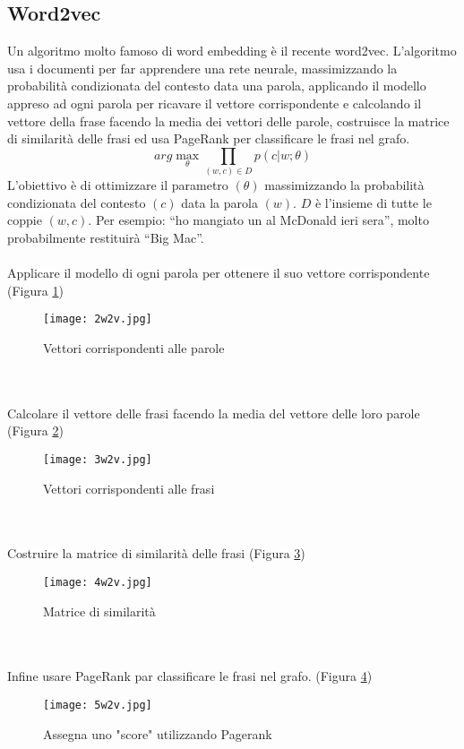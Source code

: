 \subsection{Word2vec}
Un algoritmo molto famoso di word embedding è il recente word2vec. L’algoritmo usa i documenti per far apprendere una rete neurale, massimizzando la probabilità condizionata del contesto data una parola, applicando il modello appreso ad ogni parola per ricavare il vettore corrispondente e calcolando il vettore della frase facendo la media dei vettori delle parole, costruisce la matrice di similarità delle frasi ed usa PageRank per classificare le frasi nel grafo.
\begin{equation}
   arg\max_{\theta} \prod_{\left ( w, c \right ) \in D} p\left ( c|w; \theta \right )
\end{equation}
L’obiettivo è di ottimizzare il parametro $ \left (\theta \right )$ massimizzando la probabilità condizionata del contesto $\left ( c \right )$ data la parola $\left ( w \right )$. $D$ è l’insieme di tutte le coppie $\left ( w, c \right )$. 
Per esempio: “ho mangiato un \underline{\hspace{1cm}}  al McDonald ieri sera”, molto probabilmente restituirà “Big Mac”.
\\\\
Applicare il modello di ogni parola per ottenere il suo vettore corrispondente (Figura \ref{2w2v})
\begin{figure}[htb]
	\centering
	\texttt{[image: 2w2v.jpg]}
	\caption{Vettori corrispondenti alle parole}
	\label{2w2v}
\end{figure}
\\\\
Calcolare il vettore delle frasi facendo la media del vettore delle loro parole (Figura \ref{3w2v})
\begin{figure}[htb]
	\centering
	\texttt{[image: 3w2v.jpg]}
	\caption{Vettori corrispondenti alle frasi}
	\label{3w2v}
\end{figure}
\\\\
Costruire la matrice di similarità delle frasi (Figura \ref{4w2v})
\begin{figure}[htb]
	\centering
	\texttt{[image: 4w2v.jpg]}
	\caption{Matrice di similarità}
	\label{4w2v}
\end{figure}
\\\\
Infine usare PageRank par classificare le frasi nel grafo.
 (Figura \ref{5w2v})
\begin{figure}[htb]
	\centering
	\texttt{[image: 5w2v.jpg]}
	\caption{Assegna uno "score" utilizzando Pagerank}
	\label{5w2v}
\end{figure}

